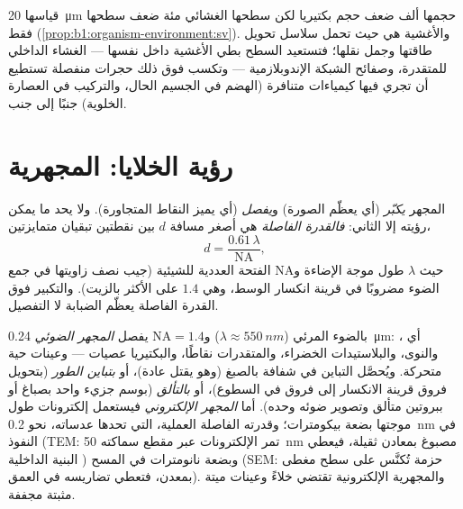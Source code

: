 \begin{example}\label{ex:b1:cell-unit-of-life:whycompart}
 قياسها \qty{20}{\micro m} حجمها ألف ضعف حجم بكتيريا لكن سطحها
الغشائي مئة ضعف سطحها فقط
(\cref{prop:b1:organism-environment:sv}). والأغشية هي حيث تحمل
 سلاسل تحويل طاقتها وجمل نقلها؛ فتستعيد  السطح
بطي الأغشية داخل نفسها --- الغشاء الداخلي للمتقدرة، وصفائح الشبكة
الإندوبلازمية --- وتكسب فوق ذلك حجرات منفصلة تستطيع أن تجري فيها
كيمياءات متنافرة (الهضم في الجسيم الحال، والتركيب في العصارة
الخلوية) جنبًا إلى جنب.
\end{example}

\section{رؤية الخلايا: المجهرية}

\begin{definition}\label{def:b1:cell-unit-of-life:resolution}
المجهر \emph{يكبّر} (أي يعظّم الصورة)
و\emph{يفصل} (أي يميز النقاط المتجاورة). ولا يحد ما يمكن
رؤيته إلا الثاني: \emph{فالقدرة الفاصلة} هي أصغر
مسافة $d$ بين نقطتين تبقيان متمايزتين،
\[
d = \frac{0.61\,\lambda}{\mathrm{NA}},
\]
حيث $\lambda$ طول موجة الإضاءة و$\mathrm{NA}$ الفتحة العددية للشيئية
(جيب نصف زاويتها في جمع الضوء مضروبًا في قرينة انكسار الوسط، وهي
$1.4$ على الأكثر بالزيت). والتكبير فوق القدرة الفاصلة يعظّم الضبابة
لا التفصيل.
\end{definition}

\begin{proposition}\label{prop:b1:cell-unit-of-life:microscopes}
بالضوء المرئي ($\lambda \approx \qty{550}{nm}$) و$\mathrm{NA} = 1.4$
يفصل \emph{المجهر الضوئي} \qty{0.24}{\micro m}:
أي ، والنوى، والبلاستيدات الخضراء، والمتقدرات نقاطًا،
والبكتيريا عصيات --- وعينات حية متحركة. ويُحصَّل التباين في 
شفافة بالصبغ (وهو يقتل عادة)، أو \emph{بتباين الطور} (بتحويل فروق
قرينة الانكسار إلى فروق في السطوع)، أو \emph{بالتألق} (بوسم جزيء
واحد بصباغ أو ببروتين متألق وتصوير ضوئه وحده). أما \emph{المجهر
الإلكتروني} فيستعمل إلكترونات طول موجتها بضعة
بيكومترات؛ وقدرته الفاصلة العملية، التي تحدها عدساته، نحو
\qty{0.2}{nm} في النفوذ (TEM: تمر الإلكترونات عبر مقطع سماكته
\qty{50}{nm} مصبوغ بمعادن ثقيلة، فيعطي البنية الداخلية )
وبضعة نانومترات في المسح (SEM: حزمة تُكنَّس على سطح مغطى بمعدن،
فتعطي تضاريسه في العمق). والمجهرية الإلكترونية تقتضي خلاءً وعينات
ميتة مثبتة مجففة.
\end{proposition}

